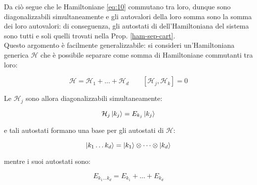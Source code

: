 Da ciò segue che le Hamiltoniane \ref{eq:10} commutano tra loro, dunque sono diagonalizzabili simultaneamente e gli autovalori della loro somma sono la somma dei loro autovalori: di conseguenza, gli autostati di dell'Hamiltoniana del sistema sono tutti e soli quelli trovati nella Prop. \ref{ham-sep-cart}.\\
%
Questo argomento è facilmente generalizzabile: si consideri un'Hamiltoniana generica $ \mathcal{H} $ che è possibile separare come somma di Hamiltoniane commutanti tra loro:

\begin{equation}
	\mathcal{H} = \mathcal{H}_1 + \dots + \mathcal{H}_d \qquad \left[\mathcal{H}_j, \mathcal{H}_k\right] = 0
	\label{eq:13}
\end{equation}

Le $ \mathcal{H}_j $ sono allora diagonalizzabili simultaneamente:

\begin{equation}
	\mathcal{H}_j \ket{k_j} = E_{k_j} \ket{k_j}
	\label{eq:14}
\end{equation}

e tali autostati formano una base per gli autostati di $ \mathcal{H} $:

\begin{equation}
	\ket{k_1 \dots k_d} = \ket{k_1} \otimes \dots \otimes \ket{k_d}
	\label{eq:15}
\end{equation}

mentre i suoi autostati sono:

\begin{equation}
	E_{k_1 \dots k_d} = E_{k_1} + \dots + E_{k_d}
	\label{eq:16}
\end{equation}

